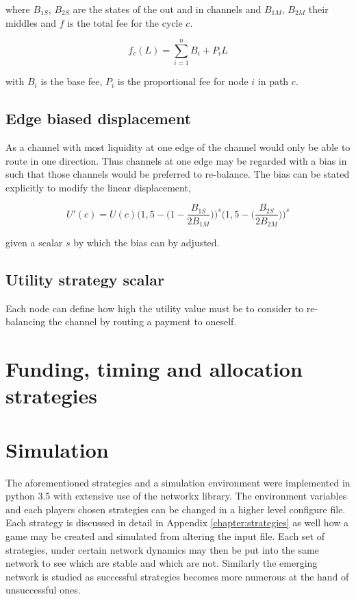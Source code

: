 where $B_{1S}$, $B_{2S}$ are the states of the out and in channels and $B_{1M}$, $B_{2M}$ their middles and $f$ is the total fee for the cycle $c$. 

\[f_c(L) = \sum_{i=1}^{n} B_i + P_iL \]

with $B_i$ is the base fee, $P_i$ is the proportional fee for node $i$ in path $c$.

\subsection{Edge biased displacement}
\label{sec:edge:bias:displacement}

As a channel with most liquidity at one edge of the channel would only be able to route in one direction. Thus channels at one edge may be regarded with a bias in such that those channels would be preferred to re-balance. The bias can be stated explicitly to modify the linear displacement,

\[ U'(c) = U(c) \bigg(1,5 - \big(1 - \dfrac{B_{1S}}{2B_{1M}}\big) \bigg)^s \bigg(1,5 - \big(\dfrac{B_{2S}}{2B_{2M}}\big)\bigg)^s  \]

given a scalar $s$ by which the bias can by adjusted.

\subsection{Utility strategy scalar}

Each node can define how high the utility value must be to consider to re-balancing the channel by routing a payment to oneself.

\section{Funding, timing and allocation strategies}

\section{Simulation}

The aforementioned strategies and a simulation environment were implemented in python 3.5 with extensive use of the networkx library. The environment variables and each players chosen strategies can be changed in a higher level configure file. Each strategy is discussed in detail in Appendix \ref{chapter:strategies} as well how a game may be created and simulated from altering the input file. Each set of strategies, under certain network dynamics may then be put into the same network to see which are stable and which are not. Similarly the emerging network is studied as successful strategies becomes more numerous at the hand of unsuccessful ones. 



